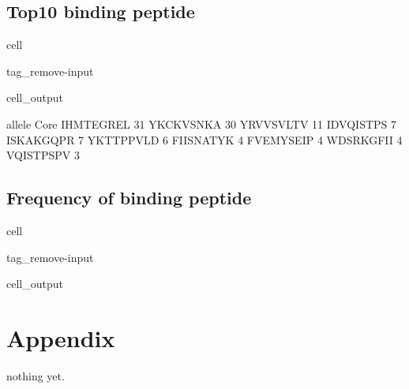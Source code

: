 \documentclass[letterpaper,10pt,english]{jupyterBook}
\begin{document}
\subsection{Top10 binding peptide}
\label{\detokenize{ipynb/chapter2:top10-binding-peptide}}
\begin{sphinxuseclass}{cell}
\begin{sphinxuseclass}{tag_remove-input}\begin{sphinxVerbatimOutput}

\begin{sphinxuseclass}{cell_output}
\begin{sphinxVerbatim}[commandchars=\\\{\}]
           allele
Core             
IHMTEGREL      31
YKCKVSNKA      30
YRVVSVLTV      11
IDVQISTPS       7
ISKAKGQPR       7
YKTTPPVLD       6
FIISNATYK       4
FVEMYSEIP       4
WDSRKGFII       4
VQISTPSPV       3
\end{sphinxVerbatim}

\end{sphinxuseclass}\end{sphinxVerbatimOutput}

\end{sphinxuseclass}
\end{sphinxuseclass}

\subsection{Frequency of binding peptide}
\label{\detokenize{ipynb/chapter2:id2}}
\begin{sphinxuseclass}{cell}
\begin{sphinxuseclass}{tag_remove-input}\begin{sphinxVerbatimOutput}

\begin{sphinxuseclass}{cell_output}
\noindent{}

\end{sphinxuseclass}\end{sphinxVerbatimOutput}

\end{sphinxuseclass}
\end{sphinxuseclass}

\section{Appendix}
\label{\detokenize{ipynb/chapter2:appendix}}
\sphinxAtStartPar
nothing yet.
\end{document}
